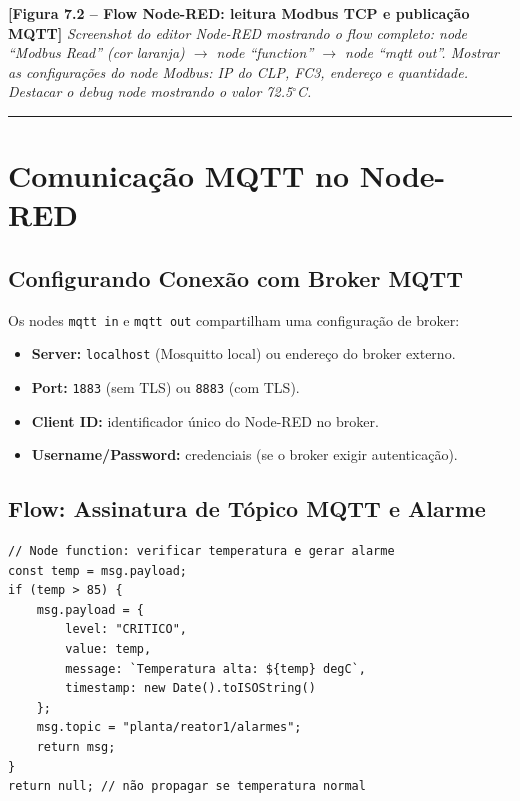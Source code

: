 \begin{caixafigura}

\textbf{{[}Figura 7.2 -- Flow Node-RED: leitura Modbus TCP e publicação MQTT{]}}
\emph{Screenshot do editor Node-RED mostrando o flow completo: node ``Modbus Read'' (cor laranja) \ensuremath{\rightarrow} node ``function'' \ensuremath{\rightarrow} node ``mqtt out''. Mostrar as configurações do node Modbus: IP do CLP, FC3, endereço e quantidade. Destacar o debug node mostrando o valor 72.5\ensuremath{^\circ}C.}

\end{caixafigura}

\begin{center}\rule{0.5\linewidth}{0.5pt}\end{center}

\section{Comunicação MQTT no Node-RED}\label{comunicauxe7uxe3o-mqtt-no-node-red}

\subsection{Configurando Conexão com Broker MQTT}\label{configurando-conexuxe3o-com-broker-mqtt}

Os nodes \passthrough{\lstinline!mqtt in!} e \passthrough{\lstinline!mqtt out!} compartilham uma configuração de broker:

\begin{itemize}
\tightlist
\item
  \textbf{Server:} \passthrough{\lstinline!localhost!} (Mosquitto local) ou endereço do broker externo.
\item
  \textbf{Port:} \passthrough{\lstinline!1883!} (sem TLS) ou \passthrough{\lstinline!8883!} (com TLS).
\item
  \textbf{Client ID:} identificador único do Node-RED no broker.
\item
  \textbf{Username/Password:} credenciais (se o broker exigir autenticação).
\end{itemize}

\subsection{Flow: Assinatura de Tópico MQTT e Alarme}\label{flow-assinatura-de-tuxf3pico-mqtt-e-alarme}

\begin{lstlisting}
// Node function: verificar temperatura e gerar alarme
const temp = msg.payload;
if (temp > 85) {
    msg.payload = {
        level: "CRITICO",
        value: temp,
        message: `Temperatura alta: ${temp} degC`,
        timestamp: new Date().toISOString()
    };
    msg.topic = "planta/reator1/alarmes";
    return msg;
}
return null; // não propagar se temperatura normal
\end{lstlisting}

